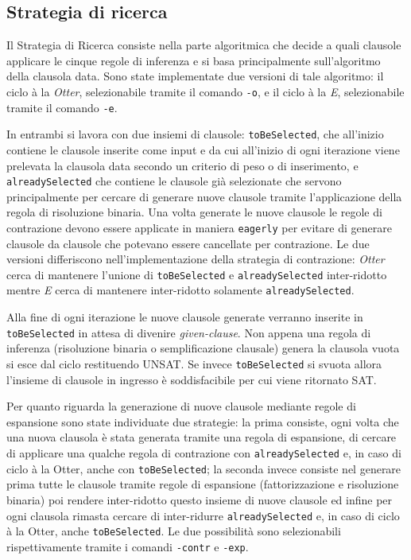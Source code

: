 \documentclass[a4paper,11pt]{article}
\begin{document}
\subsection{Strategia di ricerca}
Il Strategia di Ricerca consiste nella parte algoritmica che decide a quali clausole applicare le cinque regole di inferenza e si basa principalmente sull'algoritmo della clausola data. Sono state implementate due versioni di tale algoritmo: il ciclo à la \emph{Otter}, selezionabile tramite il comando \texttt{-o}, e il ciclo à la \emph{E}, selezionabile tramite il comando \texttt{-e}. \par
In entrambi si lavora con due insiemi di clausole: \texttt{toBeSelected}, che all'inizio contiene le clausole inserite come input e da cui all'inizio di ogni iterazione viene prelevata la clausola data secondo un criterio di peso o di inserimento, e \texttt{alreadySelected} che contiene le clausole già selezionate che servono principalmente per cercare di generare nuove clausole tramite l'applicazione della regola di risoluzione binaria.
Una volta generate le nuove clausole le regole di contrazione devono essere applicate in maniera \texttt{eagerly} per evitare di generare clausole da clausole che potevano essere cancellate per contrazione. Le due versioni differiscono nell'implementazione della strategia di contrazione: \emph{Otter} cerca di mantenere l'unione di \texttt{toBeSelected} e \texttt{alreadySelected} inter-ridotto mentre \emph{E} cerca di mantenere inter-ridotto solamente \texttt{alreadySelected}.\par 
Alla fine di ogni iterazione le nuove clausole generate verranno inserite in \texttt{toBeSelected} in attesa di divenire \emph{given-clause}. Non appena una regola di inferenza (risoluzione binaria o semplificazione clausale) genera la clausola vuota si esce dal ciclo restituendo UNSAT. Se invece \texttt{toBeSelected} si svuota allora l'insieme di clausole in ingresso è soddisfacibile per cui viene ritornato SAT. \par
Per quanto riguarda la generazione di nuove clausole mediante regole di espansione sono state individuate due strategie: 
la prima consiste, ogni volta che una nuova clausola è stata generata tramite una regola di espansione, di cercare di applicare una qualche regola di contrazione con \texttt{alreadySelected} e, in caso di ciclo à la Otter, anche con \texttt{toBeSelected}; la seconda invece consiste nel generare prima tutte le clausole tramite regole di espansione (fattorizzazione e risoluzione binaria) poi rendere inter-ridotto questo insieme di nuove clausole ed infine per ogni clausola rimasta cercare di inter-ridurre \texttt{alreadySelected} e, in caso di ciclo à la Otter, anche \texttt{toBeSelected}. Le due possibilità sono selezionabili rispettivamente tramite i comandi \texttt{-contr} e \texttt{-exp}.\par
\end{document}
